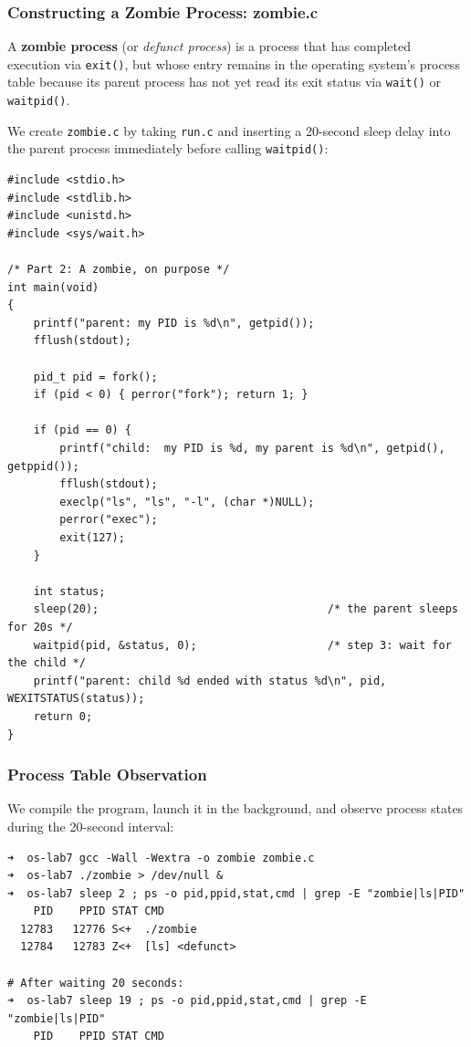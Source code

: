 \documentclass{labreport}
\begin{document}
\subsubsection{Constructing a Zombie Process: zombie.c}
A \textbf{zombie process} (or \textit{defunct process}) is a process that has completed execution via \texttt{exit()}, but whose entry remains in the operating system's process table because its parent process has not yet read its exit status via \texttt{wait()} or \texttt{waitpid()}.

We create \texttt{zombie.c} by taking \texttt{run.c} and inserting a 20-second sleep delay into the parent process immediately before calling \texttt{waitpid()}:

\begin{lstlisting}[style=c]
#include <stdio.h>
#include <stdlib.h>
#include <unistd.h>
#include <sys/wait.h>

/* Part 2: A zombie, on purpose */
int main(void)
{
    printf("parent: my PID is %d\n", getpid());
    fflush(stdout);

    pid_t pid = fork();
    if (pid < 0) { perror("fork"); return 1; }

    if (pid == 0) {
        printf("child:  my PID is %d, my parent is %d\n", getpid(), getppid());
        fflush(stdout);
        execlp("ls", "ls", "-l", (char *)NULL);
        perror("exec");
        exit(127);
    }

    int status;
    sleep(20);                                   /* the parent sleeps for 20s */
    waitpid(pid, &status, 0);                    /* step 3: wait for the child */
    printf("parent: child %d ended with status %d\n", pid, WEXITSTATUS(status));
    return 0;
}
\end{lstlisting}

\subsubsection{Process Table Observation}
We compile the program, launch it in the background, and observe process states during the 20-second interval:

\begin{lstlisting}[style=bash]
➜  os-lab7 gcc -Wall -Wextra -o zombie zombie.c
➜  os-lab7 ./zombie > /dev/null &
➜  os-lab7 sleep 2 ; ps -o pid,ppid,stat,cmd | grep -E "zombie|ls|PID"
    PID    PPID STAT CMD
  12783   12776 S<+  ./zombie
  12784   12783 Z<+  [ls] <defunct>

# After waiting 20 seconds:
➜  os-lab7 sleep 19 ; ps -o pid,ppid,stat,cmd | grep -E "zombie|ls|PID"
    PID    PPID STAT CMD
\end{lstlisting}
\end{document}
